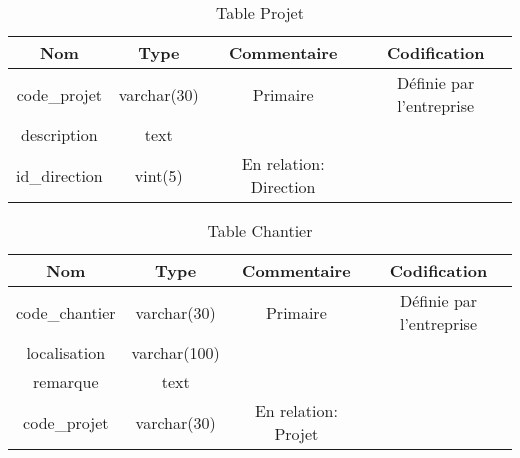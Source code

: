 \documentclass{report}
\begin{document}
\begin{table}[h!]
    \begin{center}
        \begin{tabular}{|c|c|c|c|}
            \hline
            \textbf{Nom} & \textbf{Type} & \textbf{Commentaire} & \textbf{Codification} \\
            \hline
            code\_projet & varchar(30) & Primaire & Définie par l'entreprise \\
            \hline
            description & text &  &\\
            \hline
            id\_direction & vint(5) & En relation: Direction &\\
            \hline
        \end{tabular}
    \end{center}
\caption{Table Projet}
\end{table}

\begin{table}[h!]
    \begin{center}
        \begin{tabular}{|c|c|c|c|}
            \hline
            \textbf{Nom} & \textbf{Type} & \textbf{Commentaire} & \textbf{Codification} \\
            \hline
            code\_chantier & varchar(30) & Primaire & Définie par l'entreprise \\
            \hline
            localisation & varchar(100) &  &\\
            \hline
            remarque & text &  &\\
            \hline
            code\_projet & varchar(30) & En relation: Projet &\\
            \hline
        \end{tabular}
    \end{center}
\caption{Table Chantier}
\end{table}
\end{document}
